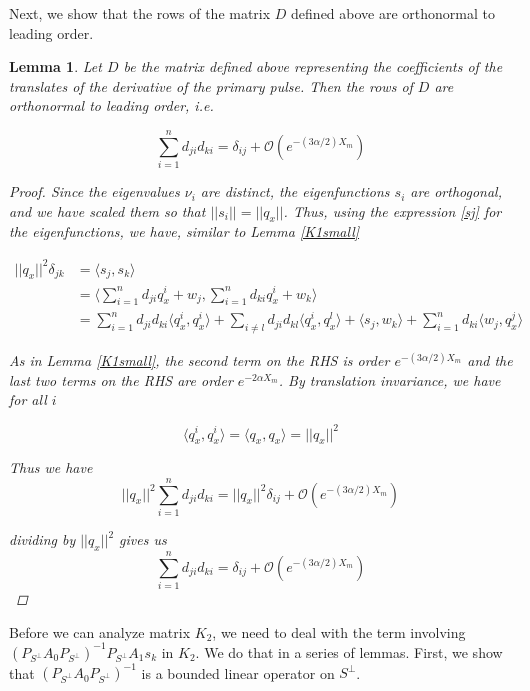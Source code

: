 \documentclass[12pt]{article}
\newtheorem{lemma}{Lemma}
\begin{document}
Next, we show that the rows of the matrix $D$ defined above are orthonormal to leading order.


\begin{lemma}\label{orthogonalD}
Let $D$ be the matrix defined above representing the coefficients of the translates of the derivative of the primary pulse. Then the rows of $D$ are orthonormal to leading order, i.e. 

\begin{equation}
\sum_{i = 1}^{n} d_{ji} d_{ki} = \delta_{ij} + \mathcal{O}(e^{-(3 \alpha/2) X_m})
\end{equation}

\begin{proof}
Since the eigenvalues $\nu_i$ are distinct, the eigenfunctions $s_i$ are orthogonal, and we have scaled them so that $||s_i|| = ||q_x||$. Thus, using the expression \eqref{sj} for the eigenfunctions, we have, similar to Lemma \ref{K1small}

\begin{align*}
||q_x||^2 \delta_{jk} &= \langle s_j, s_k \rangle \\
&= \langle \sum_{i = 1}^{n} d_{ji} q^i_x + w_j, \sum_{i = 1}^{n} d_{ki} q^i_x + w_k\rangle \\
&= \sum_{i = 1}^{n} d_{ji} d_{ki} \langle q^i_x, q^i_{x} \rangle 
+ \sum_{i \neq l} d_{ji} d_{kl} \langle q^i_x, q^l_{x} \rangle 
+ \langle s_j, w_k \rangle 
+ \sum_{i = 1}^{n} d_{ki} \langle w_j, q^j_{x} \rangle
\end{align*}

As in Lemma \ref{K1small}, the second term on the RHS is order $e^{-(3 \alpha/2) X_m}$ and the last two terms on the RHS are order $e^{-2 \alpha X_m}$. By translation invariance, we have for all $i$

\[
\langle q^i_x, q^i_{x} \rangle = \langle q_x, q_{x} \rangle = ||q_x||^2
\]

Thus we have
\[
||q_x||^2 \sum_{i = 1}^{n} d_{ji} d_{ki} = ||q_x||^2 \delta_{ij} + \mathcal{O}(e^{-(3 \alpha / 2) X_m})
\]

dividing by $||q_x||^2$ gives us
\[
\sum_{i = 1}^{n} d_{ji} d_{ki} = \delta_{ij} + \mathcal{O}(e^{-(3 \alpha / 2) X_m})
\]

\end{proof}
\end{lemma}

Before we can analyze matrix $K_2$, we need to deal with the term involving $(P_{S^\perp} A_0 P_{S^\perp})^{-1} P_{S^\perp} A_1 s_k$ in $K_2$. We do that in a series of lemmas. First, we show that $(P_{S^\perp} A_0 P_{S^\perp})^{-1}$ is a bounded linear operator on $S^\perp$.
\end{document}
